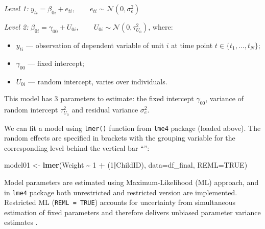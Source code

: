 \documentclass[
  12pt,
]{article}
\newenvironment{Shaded}{\begin{snugshade}}{\end{snugshade}}
\newcommand{\AttributeTok}[1]{\textcolor[rgb]{0.13,0.29,0.53}{#1}}
\newcommand{\ConstantTok}[1]{\textcolor[rgb]{0.56,0.35,0.01}{#1}}
\newcommand{\DecValTok}[1]{\textcolor[rgb]{0.00,0.00,0.81}{#1}}
\newcommand{\FunctionTok}[1]{\textcolor[rgb]{0.13,0.29,0.53}{\textbf{#1}}}
\newcommand{\NormalTok}[1]{#1}
\newcommand{\OtherTok}[1]{\textcolor[rgb]{0.56,0.35,0.01}{#1}}
\newcommand{\SpecialCharTok}[1]{\textcolor[rgb]{0.81,0.36,0.00}{\textbf{#1}}}
\providecommand{\tightlist}{%
  \setlength{\itemsep}{0pt}\setlength{\parskip}{0pt}}
\begin{document}
\emph{Level 1:}
\(y_{ti} = \beta_{0i} + e_{ti}, \qquad e_{ti} \sim \mathcal{N}(0, \sigma_e^2)\)

\emph{Level 2:}
\(\beta_{0i} = \gamma_{00} + U_{0i}, \qquad U_{0i} \sim \mathcal{N}(0, \tau_{U_0}^2)\),
where:

\begin{itemize}
\tightlist
\item
  \(y_{ti}\) --- observation of dependent variable of unit \(i\) at time
  point \(t \in \{t_1, \ldots, t_N\}\);
\item
  \(\gamma_{00}\) --- fixed intercept;
\item
  \(U_{0i}\) --- random intercept, varies over individuals.
\end{itemize}

This model has 3 parameters to estimate: the fixed intercept
\(\gamma_{00}\), variance of random intercept \(\tau_{U_0}^2\) and
residual variance \(\sigma_e^2\).

We can fit a model using \texttt{lmer()} function from \texttt{lme4}
package (loaded above). The random effects are specified in brackets
with the grouping variable for the corresponding level behind the
vertical bar ``\textbar{}'':

\begin{Shaded}
\begin{Highlighting}[]
\NormalTok{model01 }\OtherTok{\textless{}{-}} \FunctionTok{lmer}\NormalTok{(Weight }\SpecialCharTok{\textasciitilde{}} \DecValTok{1} \SpecialCharTok{+}\NormalTok{ (}\DecValTok{1}\SpecialCharTok{|}\NormalTok{ChildID), }
                \AttributeTok{data=}\NormalTok{df\_final, }\AttributeTok{REML=}\ConstantTok{TRUE}\NormalTok{)}
\end{Highlighting}
\end{Shaded}

Model parameters are estimated using Maximum-Likelihood (ML) approach,
and in \texttt{lme4} package both unrestricted and restricted version
are implemented. Restricted ML (\texttt{REML\ =\ TRUE}) accounts for
uncertainty from simultaneous estimation of fixed parameters and
therefore delivers unbiased parameter variance estimates
\autocite{hoffman_2015}.
\end{document}
